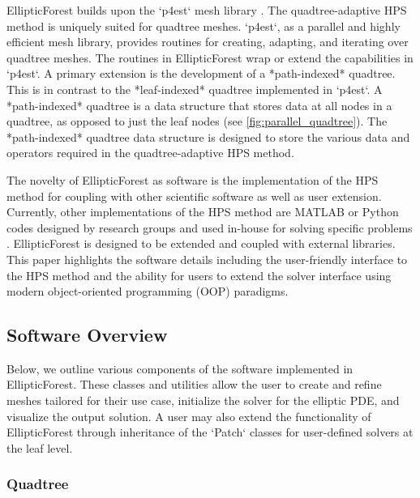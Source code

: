 EllipticForest builds upon the `p4est` mesh library \cite{burstedde2011p4est}. The quadtree-adaptive HPS method is uniquely suited for quadtree meshes. `p4est`, as a parallel and highly efficient mesh library, provides routines for creating, adapting, and iterating over quadtree meshes. The routines in EllipticForest wrap or extend the capabilities in `p4est`. A primary extension is the development of a *path-indexed* quadtree. This is in contrast to the *leaf-indexed* quadtree implemented in `p4est`. A *path-indexed* quadtree is a data structure that stores data at all nodes in a quadtree, as opposed to just the leaf nodes (see \autoref{fig:parallel_quadtree}). The *path-indexed* quadtree data structure is designed to store the various data and operators required in the quadtree-adaptive HPS method.

The novelty of EllipticForest as software is the implementation of the HPS method for coupling with other scientific software as well as user extension. Currently, other implementations of the HPS method are MATLAB or Python codes designed by research groups and used in-house for solving specific problems \cite{ultraSEM, HPS_Demos, Streamer_HPS}. EllipticForest is designed to be extended and coupled with external libraries. This paper highlights the software details including the user-friendly interface to the HPS method and the ability for users to extend the solver interface using modern object-oriented programming (OOP) paradigms.

\subsection{Software Overview}

Below, we outline various components of the software implemented in EllipticForest. These classes and utilities allow the user to create and refine meshes tailored for their use case, initialize the solver for the elliptic PDE, and visualize the output solution. A user may also extend the functionality of EllipticForest through inheritance of the `Patch` classes for user-defined solvers at the leaf level.

\subsubsection{Quadtree}

